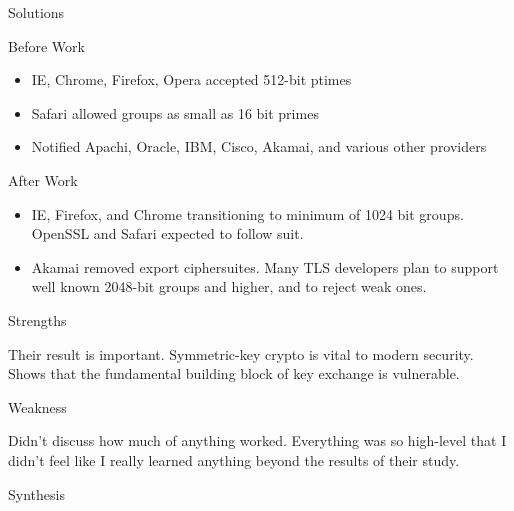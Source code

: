 \documentclass[presentation, aspectratio=54]{beamer}
\begin{document}
\begin{frame}{Solutions}

Before Work
\begin{itemize}
\item IE, Chrome, Firefox, Opera accepted 512-bit ptimes
\item Safari allowed groups as small as 16 bit primes
\item Notified Apachi, Oracle, IBM, Cisco, Akamai, and various other providers
\end{itemize}
After Work
\begin{itemize}
\item IE, Firefox, and Chrome transitioning to minimum of 1024 bit groups.
      OpenSSL and Safari expected to follow suit.
\item Akamai removed export ciphersuites. Many TLS developers plan to support
      well known 2048-bit groups and higher, and to reject weak ones.
\end{itemize}
\end{frame}


\begin{frame}{Strengths}

Their result is important. Symmetric-key crypto is vital to modern security.
Shows that the fundamental building block of key exchange is vulnerable.

\end{frame}


\begin{frame}{Weakness}

Didn't discuss how much of anything worked. Everything was so high-level that I
didn't feel like I really learned anything beyond the results of their study.

\end{frame}


\begin{frame}{Synthesis}


\end{frame}
\end{document}
